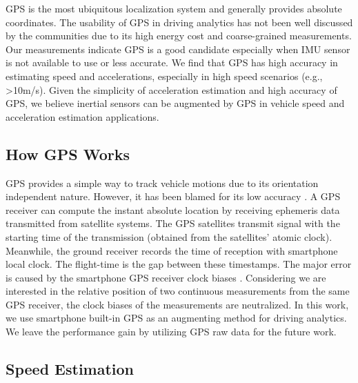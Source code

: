 

GPS is the most ubiquitous localization system and generally
provides absolute coordinates. 
The usability of GPS in driving analytics has not been 
well discussed by the communities due to its high energy cost 
and coarse-grained measurements. 
Our measurements indicate GPS is a good 
candidate especially when IMU sensor
is not available to use or less accurate. 
We find that GPS has high accuracy in 
estimating speed and accelerations, 
especially in high speed scenarios (e.g., >10m/s).  
Given the simplicity of acceleration estimation
and high accuracy of GPS, 
we believe inertial sensors can be 
augmented by GPS in vehicle speed and acceleration
estimation applications. 





\subsection{How GPS Works}

GPS provides a simple way to track vehicle motions
due to its orientation independent nature.
However, it has been blamed for its low
accuracy \cite{hedgecock2013high, gowda2016tracking}.
A GPS receiver can compute the instant absolute location
by receiving ephemeris data transmitted from satellite systems. 
The GPS satellites transmit signal with the starting 
time of the transmission (obtained from the satellites' atomic clock). 
Meanwhile, the ground receiver records the time of reception with 
smartphone local clock. 
The flight-time is the gap between these timestamps. 
The major error is caused by the smartphone GPS receiver
clock biases \cite{hedgecock2013high, gowda2016tracking}. 
Considering we are interested in the relative position of 
two continuous measurements from the same GPS receiver, 
the clock biases of the measurements are neutralized. 
In this work, we use smartphone built-in GPS as 
an augmenting method for driving analytics. 
We leave the performance gain by utilizing GPS raw data for the future work.


\subsection{Speed Estimation}

